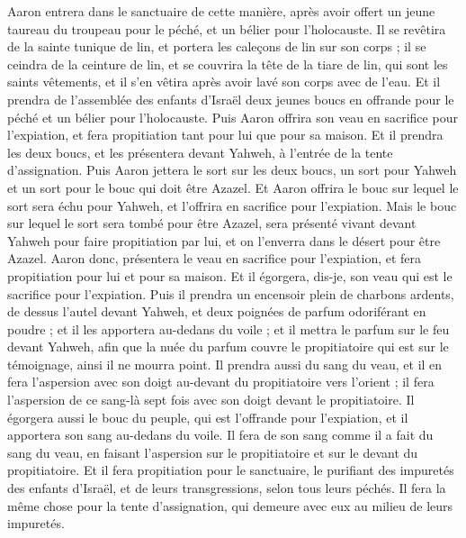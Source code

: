 \begin{multicols}{2}
Aaron entrera dans le sanctuaire de cette manière, après avoir offert un jeune taureau du troupeau pour le péché, et un bélier pour l'holocauste.
Il se revêtira de la sainte tunique de lin, et portera les caleçons de lin sur son corps ; il se ceindra de la ceinture de lin, et se couvrira la tête de la tiare de lin, qui sont les saints vêtements, et il s'en vêtira après avoir lavé son corps avec de l'eau.
Et il prendra de l'assemblée des enfants d'Israël deux jeunes boucs en offrande pour le péché et un bélier pour l'holocauste.
Puis Aaron offrira son veau en sacrifice pour l'expiation, et fera propitiation tant pour lui que pour sa maison.
Et il prendra les deux boucs, et les présentera devant Yahweh, à l'entrée de la tente d'assignation.
Puis Aaron jettera le sort sur les deux boucs, un sort pour Yahweh et un sort pour le bouc qui doit être Azazel.
Et Aaron offrira le bouc sur lequel le sort sera échu pour Yahweh, et l'offrira en sacrifice pour l'expiation.
Mais le bouc sur lequel le sort sera tombé pour être Azazel, sera présenté vivant devant Yahweh pour faire propitiation par lui, et on l'enverra dans le désert pour être Azazel.
Aaron donc, présentera le veau en sacrifice pour l'expiation, et fera propitiation pour lui et pour sa maison. Et il égorgera, dis-je, son veau qui est le sacrifice pour l'expiation.
Puis il prendra un encensoir plein de charbons ardents, de dessus l'autel devant Yahweh, et deux poignées de parfum odoriférant en poudre ; et il les apportera au-dedans du voile ;
et il mettra le parfum sur le feu devant Yahweh, afin que la nuée du parfum couvre le propitiatoire qui est sur le témoignage, ainsi il ne mourra point.
Il prendra aussi du sang du veau, et il en fera l'aspersion avec son doigt au-devant du propitiatoire vers l'orient ; il fera l'aspersion de ce sang-là sept fois avec son doigt devant le propitiatoire.
Il égorgera aussi le bouc du peuple, qui est l'offrande pour l'expiation, et il apportera son sang au-dedans du voile. Il fera de son sang comme il a fait du sang du veau, en faisant l'aspersion sur le propitiatoire et sur le devant du propitiatoire.
Et il fera propitiation pour le sanctuaire, le purifiant des impuretés des enfants d'Israël, et de leurs transgressions, selon tous leurs péchés. Il fera la même chose pour la tente d'assignation, qui demeure avec eux au milieu de leurs impuretés.

\end{multicols}

